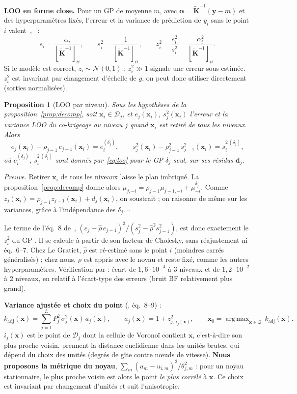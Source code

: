 \documentclass[10pt,a4paper]{article}
\theoremstyle{plain}
\newtheorem{proposition}{Proposition}
\newcommand{\vx}{\bm{x}}
\newcommand{\vd}{\bm{d}}
\newcommand{\Kt}{\widetilde{\bm{K}}}
\newcommand{\Q}{\mathcal{Q}}
\newcommand{\D}{\mathcal{D}}
\DeclareMathOperator*{\argmax}{arg\,max}
\begin{document}
\textbf{LOO en forme close.} Pour un GP de moyenne $m$, avec $\bm{\alpha}=\Kt^{-1}(\bm{y}-m)$ et des
hyperparamètres fixés, l'erreur et la variance de prédiction de $y_i$ sans le point $i$
valent~\cite{Dub83},~\cite[éq.~5.12]{RW06} :
\begin{equation}\label{eq:loo}
  e_i=\frac{\alpha_i}{[\Kt^{-1}]_{ii}},\qquad s_i^2=\frac{1}{[\Kt^{-1}]_{ii}},\qquad
  z_i^2=\frac{e_i^2}{s_i^2}=\frac{\alpha_i^2}{[\Kt^{-1}]_{ii}}.
\end{equation}
Si le modèle est correct, $z_i\sim\mathcal{N}(0,1)$ : $z_i^2\gg1$ signale une erreur sous-estimée. $z_i^2$
est invariant par changement d'échelle de $y$, on peut donc utiliser directement  (sorties
normalisées).

\begin{proposition}[LOO par niveau]\label{prop:loo}
Sous les hypothèses de la proposition~\ref{prop:decomp}, soit $\vx_i\in\D_j$, et $e_j(\vx_i)$, $s_j^2(\vx_i)$
l'erreur et la variance LOO du co-krigeage au niveau $j$ quand $\vx_i$ est retiré de tous les niveaux. Alors
\[
  e_j(\vx_i)-\rho_{j-1}\,e_{j-1}(\vx_i)=e_i^{(\delta_j)},\qquad
  s_j^2(\vx_i)-\rho_{j-1}^2\,s_{j-1}^2(\vx_i)=s_i^{2\,(\delta_j)},
\]
où $e_i^{(\delta_j)}$, $s_i^{2\,(\delta_j)}$ sont donnés par~\eqref{eq:loo} pour le GP $\delta_j$ seul, sur ses
résidus $\vd_j$.
\end{proposition}
\emph{Preuve.} Retirer $\vx_i$ de tous les niveaux laisse le plan imbriqué. La proposition~\ref{prop:decomp}
donne alors $\mu_{j,-i}=\rho_{j-1}\mu_{j-1,-i}+\mu^{\delta_j}_{-i}$. Comme
$z_j(\vx_i)=\rho_{j-1}z_{j-1}(\vx_i)+d_j(\vx_i)$, on soustrait ; on raisonne de même sur les variances,
grâce à l'indépendance des $\delta_j$. \hfill$\square$

Le terme de l'éq.~8 de~\cite{LGC15},
$(e_j-\hat\rho\,e_{j-1})^2/(s_j^2-\hat\rho^2 s_{j-1}^2)$, est donc exactement le $z_i^2$ du GP
. Il se calcule à partir de son facteur de Cholesky, sans réajustement ni éq.~6–7. Chez
Le Gratiet, $\hat\rho$ est ré-estimé sans le point $i$ (moindres carrés généralisés) ; chez nous, $\rho$ est
appris avec le noyau et reste fixé, comme les autres hyperparamètres. Vérification par
 : écart de $1{,}6\cdot10^{-4}$ à 3 niveaux et de
$1{,}2\cdot10^{-2}$ à 2 niveaux, en relatif à l'écart-type des erreurs (bruit BF relativement plus grand).

\textbf{Variance ajustée et choix du point} (\cite{LGC15}, éq.~8–9) :
\begin{equation}\label{eq:adj}
  k_{\mathrm{adj}}(\vx)=\sum_{j=1}^{L}P_j^2\,\sigma_j^2(\vx)\,a_j(\vx),\qquad
  a_j(\vx)=1+z^2_{j,\,i_j(\vx)},\qquad
  \vx_0=\argmax_{\vx\in\Q}\,k_{\mathrm{adj}}(\vx).
\end{equation}
$i_j(\vx)$ est le point de $\D_j$ dont la cellule de Voronoï contient $\vx$, c'est-à-dire son plus proche
voisin. \cite{LGC15} prennent la distance euclidienne dans les unités brutes, qui dépend du choix des unités
(degrés de gîte contre nœuds de vitesse). \textbf{Nous proposons la métrique du noyau},
$\sum_m(u_m-u_{i,m})^2/\theta_{j,m}^2$ : pour un noyau stationnaire, le plus proche voisin est alors le point
\emph{le plus corrélé} à $\vx$. Ce choix est invariant par changement d'unités et suit l'anisotropie.
\end{document}
